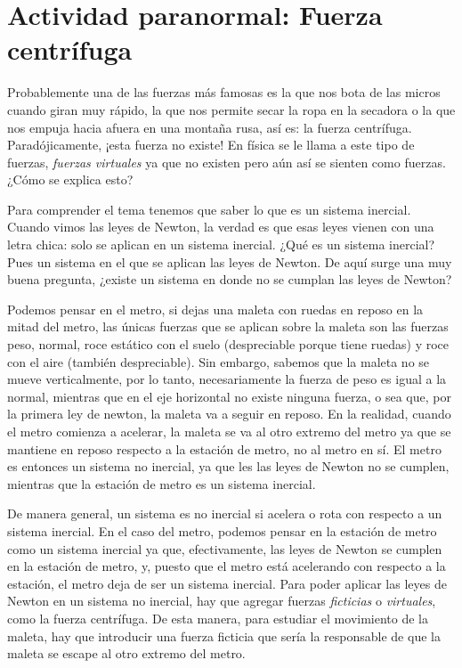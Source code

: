 \documentclass[letterpaper]{article}
\begin{document}
\section*{Actividad paranormal: Fuerza centrífuga}

Probablemente una de las fuerzas más famosas es la que nos bota de las micros cuando giran muy rápido, la que nos permite secar la ropa en la secadora o la que nos empuja hacia afuera en una montaña rusa, así es: la fuerza centrífuga. Paradójicamente, ¡esta fuerza no existe! En física se le llama a este tipo de fuerzas, \emph{fuerzas virtuales} ya que no existen pero aún así se sienten como fuerzas. ¿Cómo se explica esto?


Para comprender el tema tenemos que saber lo que es un sistema inercial. Cuando vimos las leyes de Newton, la verdad es que esas leyes vienen con una letra chica: solo se aplican en un sistema inercial. ¿Qué es un sistema inercial? Pues un sistema en el que se aplican las leyes de Newton. De aquí surge una muy buena pregunta, ¿existe un sistema en donde no se cumplan las leyes de Newton? 

Podemos pensar en el metro, si dejas una maleta con ruedas en reposo en la mitad del metro, las únicas fuerzas que se aplican sobre la maleta son las fuerzas peso, normal, roce estático con el suelo (despreciable porque tiene ruedas) y roce con el aire (también despreciable). Sin embargo, sabemos que la maleta no se mueve verticalmente, por lo tanto, necesariamente la fuerza de peso es igual a la normal, mientras que en el eje horizontal no existe ninguna fuerza, o sea que, por la primera ley de newton, la maleta va a seguir en reposo. En la realidad, cuando el metro comienza a acelerar, la maleta se va al otro extremo del metro ya que se mantiene en reposo respecto a la estación de metro, no al metro en sí. El metro es entonces un sistema no inercial, ya que les las leyes de Newton no se cumplen, mientras que la estación de metro es un sistema inercial.

De manera general, un sistema es no inercial si acelera o rota con respecto a un sistema inercial. En el caso del metro, podemos pensar en la estación de metro como un sistema inercial ya que, efectivamente, las leyes de Newton se cumplen en la estación de metro, y, puesto que el metro está acelerando con respecto a la estación, el metro deja de ser un sistema inercial. Para poder aplicar las leyes de Newton en un sistema no inercial, hay que agregar fuerzas \emph{ficticias} o \emph{virtuales}, como la fuerza centrífuga. De esta manera, para estudiar el movimiento de la maleta, hay que introducir una fuerza ficticia que sería la responsable de que la maleta se escape al otro extremo del metro.                                                                                                                                   
\end{document}
